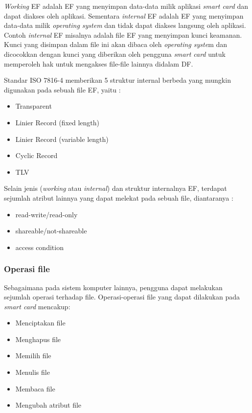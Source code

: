  \emph{Working} EF adalah EF yang menyimpan data-data milik aplikasi \textsl{smart card} dan dapat diakses oleh aplikasi. Sementara \emph{internal} EF adalah EF yang menyimpan data-data milik \emph{operating system} dan tidak dapat diakses langsung oleh aplikasi. Contoh \emph{internal} EF misalnya adalah file EF yang menyimpan kunci keamanan. Kunci yang disimpan dalam file ini akan dibaca oleh \emph{operating syste}m dan dicocokkan dengan kunci yang diberikan oleh pengguna \textsl{smart card} untuk memperoleh hak untuk mengakses file-file lainnya didalam DF.

Standar ISO 7816-4 memberikan 5 struktur internal berbeda yang mungkin digunakan pada sebuah file EF, yaitu :
\begin {itemize}
\item Transparent
\item Linier Record (fixed length)
\item Linier Record (variable length)
\item Cyclic Record
\item TLV
\end {itemize}

Selain jenis (\emph{working} atau \emph{internal}) dan struktur internalnya EF, terdapat sejumlah atribut lainnya yang dapat melekat pada sebuah file, diantaranya :
\begin {itemize}
\item read-write/read-only
\item shareable/not-shareable
\item access condition
\end {itemize}

\subsubsection{Operasi file}
\label{file-operation}

Sebagaimana pada sistem komputer lainnya, pengguna dapat melakukan sejumlah operasi terhadap file. Operasi-operasi file yang dapat dilakukan pada \textsl{smart card} mencakup:

\begin{itemize}
\item Menciptakan file
\item Menghapus file
\item Memilih file
\item Menulis file
\item Membaca file
\item Mengubah atribut file
\end{itemize}

